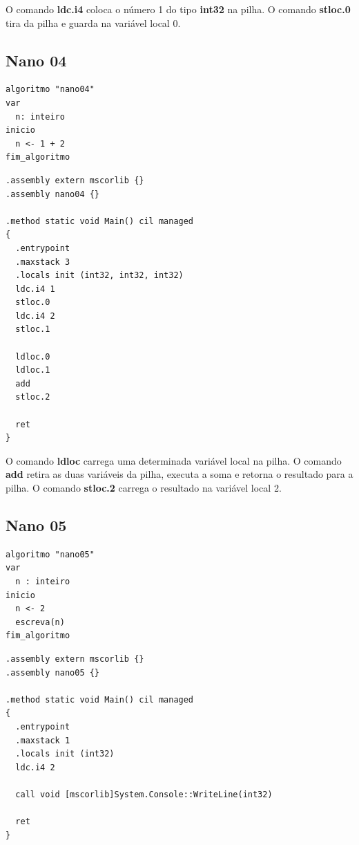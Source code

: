 \documentclass[hidelinks,12pt]{article}
\begin{document}
	O comando {\bf ldc.i4} coloca o número 1 do tipo {\bf int32} na pilha.
	O comando {\bf stloc.0} tira da pilha e guarda na variável local 0.
\subsection{Nano 04}

\begin{lstlisting}[caption=Atribuição de uma soma de inteiros a uma variável (Portugol)]
algoritmo "nano04"
var
  n: inteiro
inicio
  n <- 1 + 2
fim_algoritmo

\end{lstlisting}
\begin{lstlisting}[caption=Atribuição de uma soma de inteiros a uma variável (CIL)]
.assembly extern mscorlib {}
.assembly nano04 {}

.method static void Main() cil managed
{
  .entrypoint
  .maxstack 3
  .locals init (int32, int32, int32)
  ldc.i4 1
  stloc.0
  ldc.i4 2
  stloc.1
  
  ldloc.0
  ldloc.1
  add
  stloc.2

  ret
}

\end{lstlisting}

O comando {\bf ldloc} carrega uma determinada variável local na pilha. O comando {\bf add} retira as duas variáveis da pilha, executa a soma e retorna o resultado para a pilha. O comando {\bf stloc.2} carrega o resultado na variável local 2.

\subsection{Nano 05}

\begin{lstlisting}[caption=Inclusão do comando de impressão (Portugol)]
algoritmo "nano05"
var
  n : inteiro
inicio
  n <- 2
  escreva(n)
fim_algoritmo

\end{lstlisting}

\begin{lstlisting}[caption=Inclusão do comando de impressão (CIL)]
.assembly extern mscorlib {}
.assembly nano05 {}

.method static void Main() cil managed
{
  .entrypoint
  .maxstack 1
  .locals init (int32)
  ldc.i4 2
 
  call void [mscorlib]System.Console::WriteLine(int32)

  ret
}

\end{lstlisting}
\end{document}
